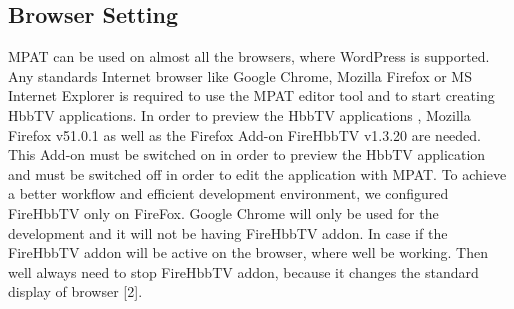 \subsection{Browser Setting}

MPAT can be used on almost all the browsers, where
WordPress is supported. Any standards Internet browser like
Google Chrome, Mozilla Firefox or MS Internet Explorer is
required to use the MPAT editor tool and to start creating
HbbTV applications.
In order to preview the HbbTV applications , Mozilla
Firefox v51.0.1 as well as the Firefox Add-on FireHbbTV
v1.3.20 are needed. This Add-on must be switched on in order
to preview the HbbTV application and must be switched off
in order to edit the application with MPAT.
To achieve a better workflow and efficient development
environment, we configured FireHbbTV only on FireFox.
Google Chrome will only be used for the development and it
will not be having FireHbbTV addon. In case if the FireHbbTV
addon will be active on the browser, where well be working.
Then well always need to stop FireHbbTV addon, because it
changes the standard display of browser [2].